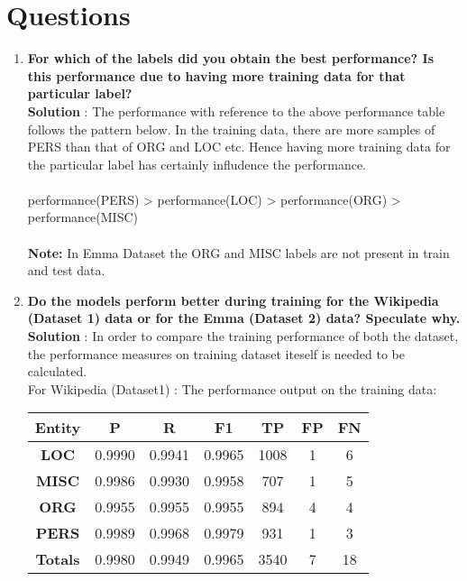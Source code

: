 \documentclass[12pt]{article}
\begin{document}
\section{Questions}
\begin{enumerate}
\item \textbf{ For which of the labels did you obtain the best performance? Is this performance due to having more training data for that particular label?}\\

\textbf{Solution} : The performance with reference to the above performance table follows the pattern below. In the training data, there are more samples of PERS than that of ORG and LOC etc. Hence having more training data for the particular label has certainly infludence the performance. \\
    \\performance(PERS) > performance(LOC) > performance(ORG) > performance(MISC)\\
\\\textbf{Note:} In Emma Dataset the ORG and MISC labels are not present in train and test data.     
\item \textbf{Do the models perform better during training for the Wikipedia (Dataset 1) data or for the Emma (Dataset 2) data? Speculate why.} \\

\textbf{Solution} : In order to compare the training performance of both the dataset, the performance measures on training dataset iteself is needed to be calculated. \\
For Wikipedia (Dataset1) : The performance output on the training data:\\

\begin{table}[h!]
\centering
\begin{tabular}{ |c|c|c|c|c|c|c|} 
\hline 
\textbf{Entity} & \textbf{P} & \textbf{R} & \textbf{F1} &\textbf{TP} &\textbf{FP} & \textbf{FN} \\ [2ex]
\hline 
\textbf{LOC} & 0.9990 & 0.9941 & 0.9965 & 1008 & 1 & 6\\ [1ex]
\hline 
\textbf{MISC} & 0.9986 & 0.9930 & 0.9958 &707 & 1 & 5\\ [1ex]
\hline
\textbf{ORG} & 0.9955 & 0.9955 & 0.9955  & 894 & 4 & 4\\  [1ex]
\hline
\textbf{PERS} & 0.9989 & 0.9968 & 0.9979 &931 & 1 & 3\\ [1ex]
\hline
\textbf{Totals} & 0.9980 & 0.9949 & 0.9965 & 3540 & 7 & 18 \\  [1ex]


\end{tabular}
\end{table}
\end{enumerate}
\end{document}

